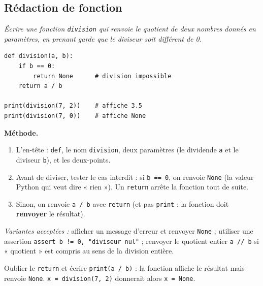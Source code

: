 \documentclass[addpoints, 11pt]{exam}
\newcommand{\enonce}[1]{\textit{#1}\par\smallskip}
\newcommand{\methode}{\par\smallskip\noindent\textbf{Méthode.}\ }
\newcommand{\code}[1]{\texttt{#1}}
\DeclareRobustCommand{\_}{\textunderscore\allowbreak}
\begin{document}
\begin{questions}
\section{Rédaction de fonction}

\question[2] \enonce{Écrire une fonction \code{division} qui renvoie le quotient de deux nombres donnés en paramètres, en prenant garde que le diviseur soit différent de 0.}
\begin{reponse}
\begin{lstlisting}
def division(a, b):
    if b == 0:
        return None      # division impossible
    return a / b

print(division(7, 2))    # affiche 3.5
print(division(7, 0))    # affiche None
\end{lstlisting}
\end{reponse}
\methode
\begin{enumerate}
  \item L'en-tête : \code{def}, le nom \code{division}, deux paramètres (le dividende \code{a} et le diviseur \code{b}), et les deux-points.
  \item Avant de diviser, tester le cas interdit : si \code{b == 0}, on renvoie \code{None} (la valeur Python qui veut dire « rien »). Un \code{return} arrête la fonction tout de suite.
  \item Sinon, on renvoie \code{a / b} avec \code{return} (et pas \code{print} : la fonction doit \textbf{renvoyer} le résultat).
\end{enumerate}
\textit{Variantes acceptées :} afficher un message d'erreur et renvoyer \code{None} ; utiliser une assertion \code{assert b != 0, "diviseur nul"} ; renvoyer le quotient entier \code{a // b} si « quotient » est compris au sens de la division entière.
\begin{erreur}
Oublier le \code{return} et écrire \code{print(a / b)} : la fonction affiche le résultat mais renvoie \code{None}. \code{x = division(7, 2)} donnerait alors \code{x = None}.
\end{erreur}

\end{questions}
\end{document}
